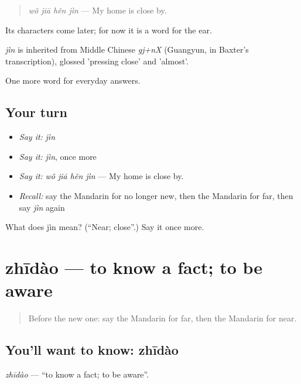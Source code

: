 \begin{quote}
\emph{wǒ jiā hěn jìn} — My home is close by.
\end{quote}

Its characters come later; for now it is a word for the ear.

\begin{cousinweb}
\emph{jìn} is inherited from Middle Chinese \emph{gj+nX} (Guangyun, in Baxter's transcription), glossed 'pressing close' and 'almost'.
\end{cousinweb}

\begin{grammarlens}[title={What you've built}]
One more word for everyday answers.
\end{grammarlens}

\subsection*{Your turn}
\begin{itemize}
\raggedright
  \item \emph{Say it:} \emph{jìn}
  \item \emph{Say it:} \emph{jìn}, once more
  \item \emph{Say it:} \emph{wǒ jiā hěn jìn} — My home is close by.
  \item \emph{Recall:} say the Mandarin for no longer new, then the Mandarin for far, then say \emph{jìn} again
\end{itemize}

\begin{tcolorbox}[breakable,colback=teal!4,colframe=teal!35!black,title={Before you move on}]
What does jìn mean? (\textquotedblleft{}Near; close\textquotedblright{}.) Say it once more.
\end{tcolorbox}
\section[zhīdào]{zhīdào — to know a fact; to be aware}

\label{lesson:ZH-C62-zhidao}



\begin{quote}
Before the new one: say the Mandarin for far, then the Mandarin for near.
\end{quote}

\subsection*{You'll want to know: zhīdào}
\emph{zhīdào} — \textquotedblleft{}to know a fact; to be aware\textquotedblright{}.

